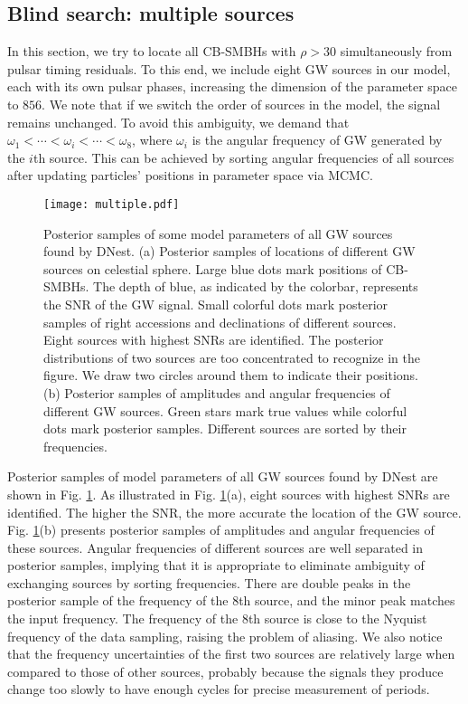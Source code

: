 \documentclass[times,tight]{aastex631}
\begin{document}
\subsection{Blind search: multiple sources}
In this section, we try to locate all CB-SMBHs with $\rho > 30$ simultaneously from pulsar timing residuals.
To this end, we include eight GW sources in our model, each with its own pulsar phases, increasing the dimension of the parameter space to $856$.
We note that if we switch the order of sources in the model, the signal remains unchanged.
To avoid this ambiguity, we demand that $\omega_1 < \cdots < \omega_i < \cdots < \omega_8$, where $\omega_i$ is the angular frequency of GW generated by the $i$th source.
This can be achieved by sorting angular frequencies of all sources after updating particles' positions in parameter space via MCMC.

\begin{figure}
    \centering
    \texttt{[image: multiple.pdf]}
    \caption{Posterior samples of some model parameters of all GW sources found by DNest.
    (a) Posterior samples of locations of different GW sources on celestial sphere. 
    Large blue dots mark positions of CB-SMBHs.
    The depth of blue, as indicated by the colorbar, represents the SNR of the GW signal.
    Small colorful dots mark posterior samples of right accessions and declinations of different sources.
    Eight sources with highest SNRs are identified.
    The posterior distributions of two sources are too concentrated to recognize in the figure. We draw two circles around them to indicate their positions.
    (b) Posterior samples of amplitudes and angular frequencies of different GW sources.
    Green stars mark true values while colorful dots mark posterior samples.
    Different sources are sorted by their frequencies.
    \label{fig:multi}}
\end{figure}

Posterior samples of model parameters of all GW sources found by DNest are shown in Fig. \ref{fig:multi}.
As illustrated in Fig. \ref{fig:multi}(a), eight sources with highest SNRs are identified.
The higher the SNR, the more accurate the location of the GW source.
Fig. \ref{fig:multi}(b) presents posterior samples of amplitudes and angular frequencies of these sources.
Angular frequencies of different sources are well separated in posterior samples, implying that it is appropriate to eliminate ambiguity of exchanging sources by sorting frequencies.
There are double peaks in the posterior sample of the frequency of the $8$th source, and the minor peak matches the input frequency.
The frequency of the $8$th source is close to the Nyquist frequency of the data sampling, raising the problem of aliasing.
We also notice that the frequency uncertainties of the first two sources are relatively large when compared to those of other sources, probably because the signals they produce change too slowly to have enough cycles for precise measurement of periods.
\end{document}
